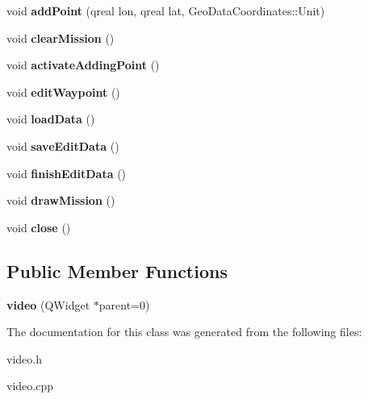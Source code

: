 \begin{DoxyCompactItemize}
\item 
\hypertarget{classvideo_a3f1d3a8f660a110096fb1698b3402ec6}{void {\bfseries add\-Point} (qreal lon, qreal lat, Geo\-Data\-Coordinates\-::\-Unit)}\label{classvideo_a3f1d3a8f660a110096fb1698b3402ec6}

\item 
\hypertarget{classvideo_a8bb87632e7c85200fbd91337850653da}{void {\bfseries clear\-Mission} ()}\label{classvideo_a8bb87632e7c85200fbd91337850653da}

\item 
\hypertarget{classvideo_a952983786bee6f590478bc6af6101cdf}{void {\bfseries activate\-Adding\-Point} ()}\label{classvideo_a952983786bee6f590478bc6af6101cdf}

\item 
\hypertarget{classvideo_a3707fc032034774e199648418c2968ea}{void {\bfseries edit\-Waypoint} ()}\label{classvideo_a3707fc032034774e199648418c2968ea}

\item 
\hypertarget{classvideo_a156f8e61a286b29469f48f15848fba71}{void {\bfseries load\-Data} ()}\label{classvideo_a156f8e61a286b29469f48f15848fba71}

\item 
\hypertarget{classvideo_ac0fc01ac80b3c87a9056852f9b8831e2}{void {\bfseries save\-Edit\-Data} ()}\label{classvideo_ac0fc01ac80b3c87a9056852f9b8831e2}

\item 
\hypertarget{classvideo_a05c8d775c310e15f67f44e5116081519}{void {\bfseries finish\-Edit\-Data} ()}\label{classvideo_a05c8d775c310e15f67f44e5116081519}

\item 
\hypertarget{classvideo_a5789d98f18a04f4afe3268a66dd0ad43}{void {\bfseries draw\-Mission} ()}\label{classvideo_a5789d98f18a04f4afe3268a66dd0ad43}

\item 
\hypertarget{classvideo_ade0bf682d0cbe41345c0f48fe26e8f07}{void {\bfseries close} ()}\label{classvideo_ade0bf682d0cbe41345c0f48fe26e8f07}

\end{DoxyCompactItemize}
\subsection*{Public Member Functions}
\begin{DoxyCompactItemize}
\item 
\hypertarget{classvideo_ae5d33e9066ec2c972a943dea05595549}{{\bfseries video} (Q\-Widget $\ast$parent=0)}\label{classvideo_ae5d33e9066ec2c972a943dea05595549}

\end{DoxyCompactItemize}


The documentation for this class was generated from the following files\-:\begin{DoxyCompactItemize}
\item 
video.\-h\item 
video.\-cpp\end{DoxyCompactItemize}
